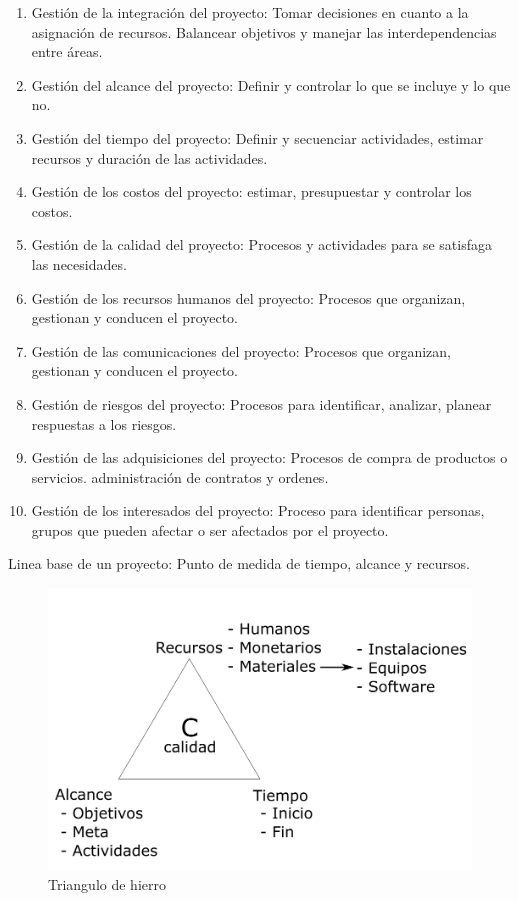 \begin{enumerate}
    \item Gestión de la integración del proyecto: Tomar decisiones en cuanto a la asignación de recursos. Balancear objetivos y manejar las interdependencias entre áreas. 
    
    \item Gestión del alcance del proyecto: Definir y controlar lo que se incluye y lo que no.
    
    \item Gestión del tiempo del proyecto: Definir y secuenciar actividades, estimar recursos y duración de las actividades. 
    
    \item Gestión de los costos del proyecto: estimar, presupuestar y controlar los costos. 
    
    \item Gestión de la calidad del proyecto: Procesos y actividades para se satisfaga las necesidades. 
    
    \item Gestión de los recursos humanos del proyecto: Procesos que organizan, gestionan y conducen el proyecto. 
    
    \item Gestión de las comunicaciones del proyecto: Procesos que organizan, gestionan y conducen el proyecto.
    
    \item Gestión de riesgos del proyecto: Procesos para identificar, analizar, planear respuestas a los riesgos. 
    
    \item Gestión de las adquisiciones del proyecto: Procesos de compra de productos o servicios. administración de contratos y ordenes. 
    
    \item Gestión de los interesados del proyecto: Proceso para identificar personas, grupos que pueden afectar o ser afectados por el proyecto. 
\end{enumerate}

Linea base de un proyecto: Punto de medida de tiempo, alcance y recursos. 

\begin{figure}[h!]
    \centering
        \includegraphics[scale=0.30]{Manufactura Integrada por Computadora Figuras/Figura03 Triangulo de Hierro.png}
        \caption{Triangulo de hierro}
\end{figure}